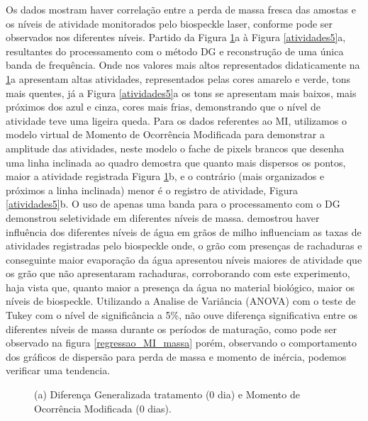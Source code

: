 \documentclass[journal,article,submit,moreauthors,pdftex,10pt,a4paper]{mdpi}
\theoremstyle{mdpi}
\newcounter{ex}
\newcounter{re}
\theoremstyle{mdpidefinition}
\begin{document}
Os dados mostram haver correlação entre a perda de massa fresca das amostas e os níveis de atividade monitorados pelo biospeckle laser, conforme pode ser observados nos diferentes níveis. Partido da Figura \ref{atividades1}a à Figura  \ref{atividades5}a, resultantes do processamento com o  método DG  e reconstrução de uma única banda de frequência. Onde nos valores mais altos representados didaticamente na \ref{atividades1}a apresentam altas atividades, representados pelas cores amarelo e verde, tons mais quentes, já a Figura \ref{atividades5}a os tons se apresentam mais baixos, mais próximos dos azul e cinza, cores mais frias, demonstrando que o nível de atividade teve uma ligeira queda. Para os dados referentes ao MI, utilizamos o modelo virtual de Momento de Ocorrência Modificada para demonstrar a amplitude das atividades, neste modelo o fache de pixels brancos que desenha uma linha inclinada ao quadro demostra que quanto mais dispersos os pontos, maior a atividade registrada Figura \ref{atividades1}b, e o contrário (mais organizados e próximos a linha inclinada) menor é o registro de atividade, Figura \ref{atividades5}b. O uso de apenas uma banda para o processamento com o DG demonstrou seletividade em diferentes níveis de massa. \citep{Zdunek2014} demostrou haver influência dos diferentes níveis de água em grãos de milho influenciam as taxas de atividades registradas pelo biospeckle onde, o grão com presenças de rachaduras e conseguinte maior evaporação da água apresentou níveis maiores de atividade que os grão que não apresentaram rachaduras, corroborando com este experimento, haja vista que, quanto maior a presença da água no material biológico,  maior os níveis de biospeckle. Utilizando a Analise de Variância (ANOVA) com o teste de Tukey com o nível de significância a 5\%, não ouve diferença significativa  entre os diferentes níveis de massa durante os períodos de maturação, como pode ser observado na figura \ref{regressao_MI_massa} porém, observando o comportamento dos gráficos de dispersão para perda de massa e momento de inércia, podemos verificar uma tendencia.


\begin{figure}[!htb]  
\centering
{}
\qquad
{}
\caption{(a) Diferença Generalizada tratamento (0 dia) e Momento de Ocorrência Modificada (0 dias).}
\label{atividades1}
\end{figure}
\end{document}
